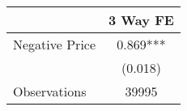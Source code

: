 \begin{tabular}{lc}
\hline
& 3 Way FE \\
\hline
Negative Price & 0.869*** \\
 & (0.018) \\
\hline
Observations & 39995 \\
\hline
\end{tabular}